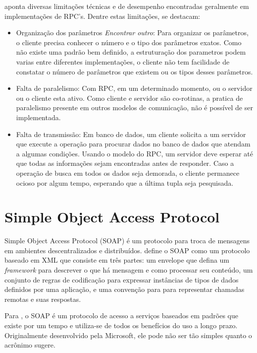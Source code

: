  aponta diversas limitações técnicas e de desempenho encontradas geralmente em implementações de RPC's. Dentre estas limitações, se destacam:

\begin{itemize}

\item Organização dos parâmetros \textit{Encontrar outro}: Para organizar os parâmetros, o cliente precisa conhecer o número e o tipo dos parâmetros exatos. Como não existe uma padrão bem definido, a estruturação dos parametros podem varias entre diferentes implementações, o cliente não tem facilidade de constatar o número de parâmetros que existem ou os tipos desses parâmetros.

\item Falta de paralelismo: Com RPC, em um determinado momento, ou o servidor ou o cliente esta ativo. Como cliente e servidor são co-rotinas, a pratica de paralelismo presente em outros modelos de comunicação, não é possível de ser implementada.

\item Falta de transmissão: Em banco de dados, um cliente solicita a um servidor que execute a operação para procurar dados no banco de dados que atendam a algumas condições. Usando o modelo do RPC, um servidor deve esperar até que todas as informações sejam encontradas antes de responder. Caso a operação de busca em todos os dados seja demorada, o cliente permanece ocioso por algum tempo, esperando que a última tupla seja pesquisada.

\end{itemize}

\section{Simple Object Access Protocol}\label{sec:soap}

Simple Object Access Protocol (SOAP) é um protocolo para troca de mensagens em ambientes descentralizados e distribuídos.  define o SOAP como 
um protocolo baseado em XML que consiste em três partes: um envelope que defina um \textit{framework} para descrever o que há mensagem e como processar seu conteúdo, um conjunto de regras de codificação para expressar instâncias de tipos de dados definidos por uma aplicação, e uma convenção para para representar chamadas remotas e suas respostas.

Para , o SOAP é um protocolo de acesso a serviços baseados em padrões que existe por um tempo e utiliza-se de todos os benefícios do uso a longo prazo. Originalmente desenvolvido pela Microsoft, ele pode não ser tão simples quanto o acrônimo sugere.

